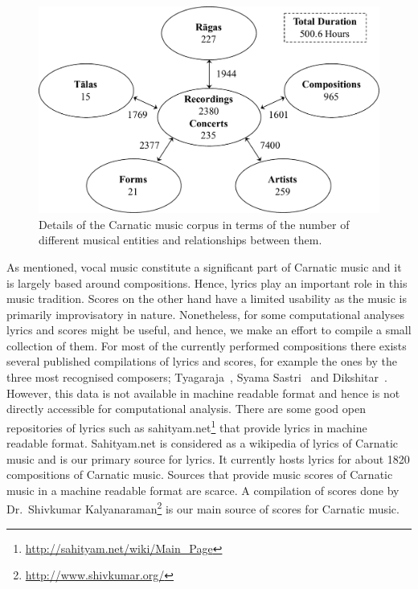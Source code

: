 \begin{figure}
	\begin{center}
		\includegraphics[width=\figSizeNinety]{ch04_datasets/figures/carnatic_corpus_main.pdf}
	\end{center}
	\caption{Details of the Carnatic music corpus in terms of the number of different musical entities and relationships between them.}
	\label{fig:carnatic_corpus_details}
\end{figure}

As mentioned, vocal music constitute a significant part of Carnatic music and it is largely based around compositions. Hence, lyrics play an important role in this music tradition. Scores on the other hand have a limited usability as the music is primarily improvisatory in nature. Nonetheless, for some computational analyses lyrics and scores might be useful, and hence, we make an effort to compile a small collection of them. For most of the currently performed compositions there exists several published compilations of lyrics and scores, for example the ones by the three most recognised composers; Tyagaraja~\citep{TKG_Rao_Tyagaraja}, Syama Sastri~\citep{TKG_Rao_syama} and Dikshitar~\citep{TKG_Rao_Muddusvami}. However, this data is not available in machine readable format and hence is not directly accessible for computational analysis. There are some good open repositories of lyrics such as sahityam.net\footnote{\url{http://sahityam.net/wiki/Main_Page}} that provide lyrics in machine readable format. Sahityam.net is considered as a wikipedia of lyrics of Carnatic music and is our primary source for lyrics. It currently hosts lyrics for about 1820 compositions of Carnatic music. Sources that provide music scores of Carnatic music in a machine readable format are scarce. A compilation of scores done by Dr.~Shivkumar Kalyanaraman\footnote{\url{http://www.shivkumar.org/}} is our main source of scores for Carnatic music.

